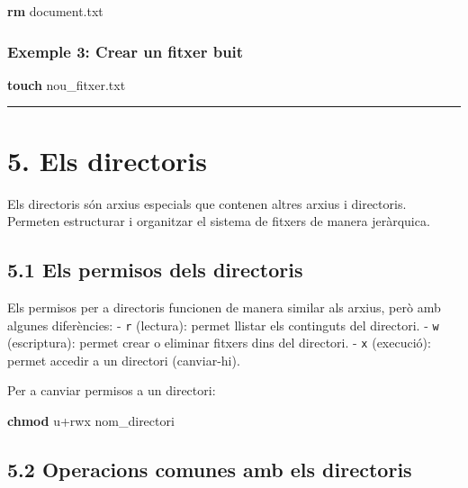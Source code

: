 \documentclass[
  12 pt,
  a4paper,
]{article}
\newenvironment{Shaded}{\begin{snugshade}}{\end{snugshade}}
\newcommand{\FunctionTok}[1]{\textcolor[rgb]{0.13,0.29,0.53}{\textbf{#1}}}
\newcommand{\NormalTok}[1]{#1}
\begin{document}
\begin{Shaded}
\begin{Highlighting}[]
\FunctionTok{rm}\NormalTok{ document.txt}
\end{Highlighting}
\end{Shaded}

\subsubsection{Exemple 3: Crear un fitxer
buit}\label{exemple-3-crear-un-fitxer-buit}

\begin{Shaded}
\begin{Highlighting}[]
\FunctionTok{touch}\NormalTok{ nou\_fitxer.txt}
\end{Highlighting}
\end{Shaded}

\begin{center}\rule{0.5\linewidth}{0.5pt}\end{center}

\section{5. Els directoris}\label{els-directoris}

Els directoris són arxius especials que contenen altres arxius i
directoris. Permeten estructurar i organitzar el sistema de fitxers de
manera jeràrquica.

\subsection{5.1 Els permisos dels
directoris}\label{els-permisos-dels-directoris}

Els permisos per a directoris funcionen de manera similar als arxius,
però amb algunes diferències: - \texttt{r} (lectura): permet llistar els
continguts del directori. - \texttt{w} (escriptura): permet crear o
eliminar fitxers dins del directori. - \texttt{x} (execució): permet
accedir a un directori (canviar-hi).

Per a canviar permisos a un directori:

\begin{Shaded}
\begin{Highlighting}[]
\FunctionTok{chmod}\NormalTok{ u+rwx nom\_directori}
\end{Highlighting}
\end{Shaded}

\subsection{5.2 Operacions comunes amb els
directoris}\label{operacions-comunes-amb-els-directoris}
\end{document}
